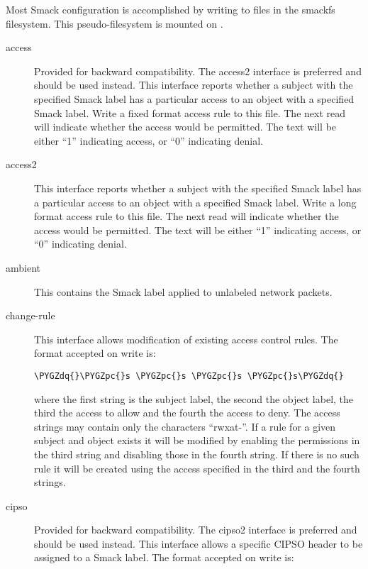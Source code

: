 \documentclass[a4paper,8pt,english]{sphinxmanual}
\def\PYGZpc{\char`\%}
\def\PYGZdq{\char`\"}
\begin{document}
Most Smack configuration is accomplished by writing to files
in the smackfs filesystem. This pseudo-filesystem is mounted
on .
\begin{description}
\item[{access}] \leavevmode
Provided for backward compatibility. The access2 interface
is preferred and should be used instead.
This interface reports whether a subject with the specified
Smack label has a particular access to an object with a
specified Smack label. Write a fixed format access rule to
this file. The next read will indicate whether the access
would be permitted. The text will be either ``1'' indicating
access, or ``0'' indicating denial.

\item[{access2}] \leavevmode
This interface reports whether a subject with the specified
Smack label has a particular access to an object with a
specified Smack label. Write a long format access rule to
this file. The next read will indicate whether the access
would be permitted. The text will be either ``1'' indicating
access, or ``0'' indicating denial.

\item[{ambient}] \leavevmode
This contains the Smack label applied to unlabeled network
packets.

\item[{change-rule}] \leavevmode
This interface allows modification of existing access control rules.
The format accepted on write is:

\begin{Verbatim}[commandchars=\\\{\}]
\PYGZdq{}\PYGZpc{}s \PYGZpc{}s \PYGZpc{}s \PYGZpc{}s\PYGZdq{}
\end{Verbatim}

where the first string is the subject label, the second the
object label, the third the access to allow and the fourth the
access to deny. The access strings may contain only the characters
``rwxat-''. If a rule for a given subject and object exists it will be
modified by enabling the permissions in the third string and disabling
those in the fourth string. If there is no such rule it will be
created using the access specified in the third and the fourth strings.

\item[{cipso}] \leavevmode
Provided for backward compatibility. The cipso2 interface
is preferred and should be used instead.
This interface allows a specific CIPSO header to be assigned
to a Smack label. The format accepted on write is:


\end{description}
\end{document}
